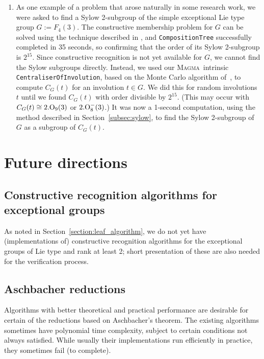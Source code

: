 \documentclass[12pt,twoside,reqno,psamsfonts]{amsproc}
\numberwithin{equation}{section}
\numberwithin{figure}{section}
\newcounter{algorithm}
\theoremstyle{plain}
\theoremstyle{definition}
\theoremstyle{remark}
\newcommand{\field}[1]{\mathbb{#1}}
\newcommand{\F}{\field{F}}
\newcommand{\MAGMA}{\textsc{Magma}}
\begin{document}
\begin{enumerate}
\item \label{invcent}
As one example of a problem that arose naturally in some research work, we
were asked to find a Sylow 2-subgroup of the simple exceptional Lie
type group $G := F_4(3)$. 
The constructive membership problem for $G$ can be solved using
the technique described in \cite{ryba_trick},
and {\tt CompositionTree} successfully completed in 35 seconds,
so confirming that 
the order of its Sylow 2-subgroup is $2^{15}$. Since constructive
recognition is not yet available for $G$, we 
cannot find the Sylow subgroups directly.
Instead, we used our \MAGMA\ intrinsic {\tt CentraliserOfInvolution},
based on the Monte Carlo algorithm of~\cite{bray00}, to compute 
$C_G(t)$ for an involution $t \in G$.
We did this for random involutions $t$ until we found
$C_G(t)$ with order divisible by $2^{15}$. (This may occur with
$C_G(t) \cong 2. {\rm O}_9(3)$ or $2. {\rm O}^-_8(3)$.) It was now
a 1-second computation, using the method described in 
Section~\ref{subsec:sylow}, to find the
Sylow 2-subgroup of $G$ as a subgroup of $C_G(t)$. 
\end{enumerate}

\section{Future directions}
\label{future}

\subsection{Constructive recognition algorithms for exceptional groups} 
As noted in Section~\ref{section:leaf_algorithm}, we do not yet have
(implementations of) constructive recognition algorithms for 
the exceptional groups of Lie type and rank at least 2;
short presentation of these are also needed for the verification process.

\subsection{Aschbacher reductions}
Algorithms with better theoretical and practical performance
are desirable for certain of the reductions
based on Aschbacher's theorem. 
The existing algorithms sometimes have polynomial time complexity,
subject to certain conditions not 
always satisfied. While usually their implementations
run efficiently in practice, they sometimes fail (to complete). 
\end{document}
